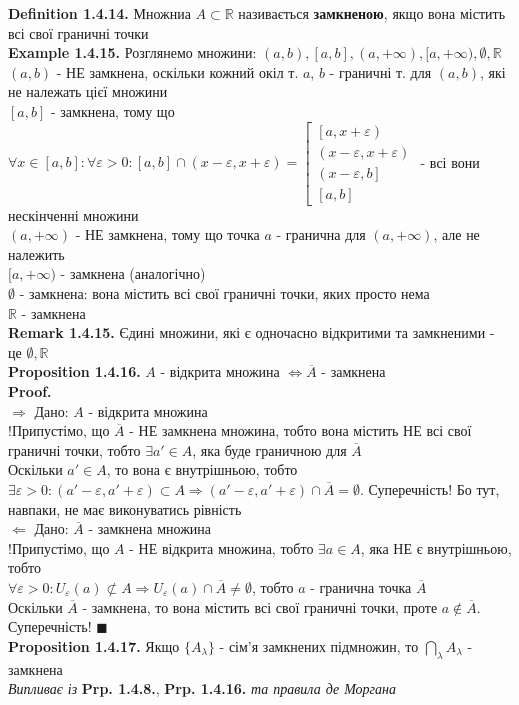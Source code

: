 \documentclass[a4paper, 14pt]{extarticle}
\def\huge{\displaystyle}
\def\bigline{\vspace{5mm}\\}
\def\defin#1{\textbf{Definition {#1}}}
\def\ex#1{\textbf{Example {#1}}}
\def\rm#1{\textbf{Remark {#1}}}
\def\prp#1{\textbf{Proposition {#1}}}
\def\proof{\textbf{Proof.}\\}
\def\bigline{\vspace{5mm}\\}
\def\qed{$\blacksquare$}
\begin{document}
\defin{1.4.14.} Множниа $A \subset \mathbb{R}$ називається \textbf{замкненою}, якщо вона містить всі свої граничні точки
\bigline
\ex{1.4.15.} Розглянемо множини: $(a,b), [a,b], (a,+\infty), [a,+\infty), \emptyset, \mathbb{R}$\\
$(a,b)$ - НЕ замкнена, оскільки кожний окіл т. $a$, $b$ - граничні т. для $(a,b)$, які не належать цієї множини
\bigline
$[a,b]$ - замкнена, тому що $\forall x \in [a,b]: \forall \varepsilon > 0: [a,b] \cap (x-\varepsilon,x+\varepsilon) = \left[
\begin{gathered}
\left[a,x+\varepsilon \right) \\
\left(x-\varepsilon, x + \varepsilon \right) \\
\left(x - \varepsilon, b\right] \\
\left[a,b\right]
\end{gathered}
 \right.$ - всі вони нескінченні множини
\bigline
$(a,+\infty)$ - НЕ замкнена, тому що точка $a$ - гранична для $(a,+\infty)$, але не належить
\bigline
$[a,+\infty)$ - замкнена (аналогічно)
\bigline
$\emptyset$ - замкнена: вона містить всі свої граничні точки, яких просто нема
\bigline
$\mathbb{R}$ - замкнена
\bigline
\rm{1.4.15.} Єдині множини, які є одночасно відкритими та замкненими - це $\emptyset, \mathbb{R}$
\bigline
\prp{1.4.16.} $A$ - відкрита множина $\iff \overline{A}$ - замкнена\\
\proof
$\boxed{\Rightarrow}$ Дано: $A$ - відкрита множина\\
!Припустімо, що $\overline{A}$ - НЕ замкнена множина, тобто вона містить НЕ всі свої граничні точки, тобто $\exists a' \in A$, яка буде граничною для $\overline{A}$\\
Оскільки $a' \in A$, то вона є внутрішньою, тобто $\exists \varepsilon > 0: (a'-\varepsilon,a'+\varepsilon) \subset A \Rightarrow (a'-\varepsilon,a'+\varepsilon) \cap \overline{A} = \emptyset$. Суперечність! Бо тут, навпаки, не має виконуватись рівність
\bigline
$\boxed{\Leftarrow}$ Дано: $\overline{A}$ - замкнена множина\\
!Припустімо, що $A$ - НЕ відкрита множина, тобто $\exists a \in A$, яка НЕ є внутрішньою, тобто\\
$\forall \varepsilon > 0: U_{\varepsilon}(a) \not\subset A \Rightarrow U_{\varepsilon}(a) \cap \overline{A} \neq \emptyset$, тобто $a$ - гранична точка $\overline{A}$\\
Оскільки $\overline{A}$ - замкнена, то вона містить всі свої граничні точки, проте $a \not\in \overline{A}$. Суперечність!
\qed
\bigline
\prp{1.4.17.} Якщо $\{A_{\lambda}\}$ - сім'я замкнених підмножин, то $\huge \bigcap_{\lambda} A_{\lambda}$ - замкнена\\
\textit{Випливає із} \textbf{Prp. 1.4.8.}, \textbf{Prp. 1.4.16.} \textit{та правила де Моргана}
\bigline
\end{document}
